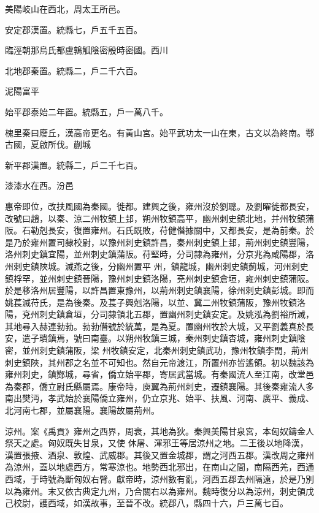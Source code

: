 \begin{pinyinscope}
 美陽岐山在西北，周太王所邑。



 安定郡漢置。統縣七，戶五千五百。



 臨涇朝那烏氏都盧鶉觚陰密殷時密國。西川



 北地郡秦置。統縣二，戶二千六百。



 泥陽富平



 始平郡泰始二年置。統縣五，戶一萬八千。



 槐里秦曰廢丘，漢高帝更名。有黃山宮。始平武功太一山在東，古文以為終南。鄠古國，夏啟所伐。蒯城



 新平郡漢置。統縣二，戶二千七百。



 漆漆水在西。汾邑



 惠帝即位，改扶風國為秦國。徙都。建興之後，雍州沒於劉聰。及劉曜徙都長安，改號曰趙，以秦、涼二州牧鎮上邽，朔州牧鎮高平，幽州刺史鎮北地，并州牧鎮蒲阪。石勒剋長安，復置雍州。石氏既敗，苻健僭據關中，又都長安，是為前秦。於是乃於雍州置司隸校尉，以豫州刺史鎮許昌，秦州刺史鎮上邽，荊州刺史鎮豐陽，洛州刺史鎮宜陽，並州刺史鎮蒲阪。苻堅時，分司隸為雍州，分京兆為咸陽郡，洛州刺史鎮陜城。滅燕之後，分幽州置平
 州，鎮龍城，幽州刺史鎮薊城，河州刺史鎮桴罕，並州刺史鎮晉陽，豫州刺史鎮洛陽，兗州刺史鎮倉垣，雍州刺史鎮蒲阪。於是移洛州居豐陽，以許昌置東豫州，以荊州刺史鎮襄陽，徐州刺史鎮彭城。即而姚萇滅苻氏，是為後秦。及萇子興剋洛陽，以並、冀二州牧鎮蒲阪，豫州牧鎮洛陽，兗州刺史鎮倉垣，分司隸領北五郡，置幽州刺史鎮安定。及姚泓為劉裕所滅，其地尋入赫連勃勃。勃勃僭號於統萬，是為夏。置幽州牧於大城，又平劉義真於長安，遣子璝鎮焉，號曰南臺。以朔州牧鎮三城，秦州刺史鎮杏城，雍州刺史鎮陰密，並州刺史鎮蒲阪，梁
 州牧鎮安定，北秦州刺史鎮武功，豫州牧鎮李閏，荊州刺史鎮陜，其州郡之名並不可知也。然自元帝渡江，所置州亦皆遙領。初以魏該為雍州刺史，鎮酂城，尋省，僑立始平郡，寄居武當城。有秦國流人至江南，改堂邑為秦郡，僑立尉氏縣屬焉。康帝時，庾翼為荊州刺史，遷鎮襄陽。其後秦雍流人多南出樊沔，孝武始於襄陽僑立雍州，仍立京兆、始平、扶風、河南、廣平、義成、北河南七郡，並屬襄陽。襄陽故屬荊州。



 涼州。案《禹貢》雍州之西界，周衰，其地為狄。秦興美陽甘泉宮，本匈奴鑄金人祭天之處。匈奴既失甘泉，又使
 休屠、渾邪王等居涼州之地。二王後以地降漢，漢置張掖、酒泉、敦煌、武威郡。其後又置金城郡，謂之河西五郡。漢改周之雍州為涼州，蓋以地處西方，常寒涼也。地勢西北邪出，在南山之間，南隔西羌，西通西域，于時號為斷匈奴右臂。獻帝時，涼州數有亂，河西五郡去州隔遠，於是乃別以為雍州。末又依古典定九州，乃合關右以為雍州。魏時復分以為涼州，刺史領戊己校尉，護西域，如漢故事，至晉不改。統郡八，縣四十六，戶三萬七百。




\end{pinyinscope}
